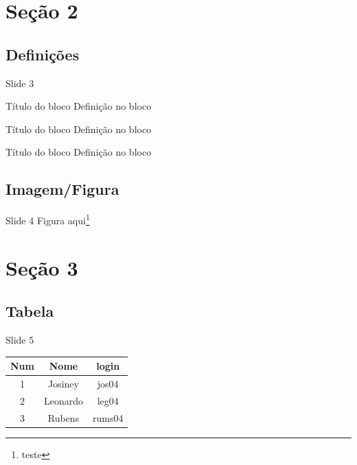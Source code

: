 \documentclass[xcolor=dvipsnames,table]{beamer}
\begin{document}
\section{Seção 2}
\subsection{Definições}
\begin{frame}{Slide 3}
	\begin{block}{Título do bloco}
		Definição no bloco
	\end{block}

	\begin{exampleblock}{Título do bloco}
		Definição no bloco
	\end{exampleblock}

	\begin{alertblock}{Título do bloco}
		Definição no bloco
	\end{alertblock}
\end{frame}

\subsection{Imagem/Figura}
\begin{frame}{Slide 4}
	Figura aqui\footnote{teste}
\end{frame}

\section{Seção 3}
\subsection{Tabela}
\begin{frame}{Slide 5}
	\begin{tabular}{|c|c|c|}
		\hline
		Num & Nome & login \\
		\hline
		\hline
		1 & Josiney & jos04 \\
		\hline
		2 & Leonardo & leg04 \\
		\hline
		3 & Rubens & rums04 \\
		\hline
	\end{tabular}
\end{frame}
\end{document}
